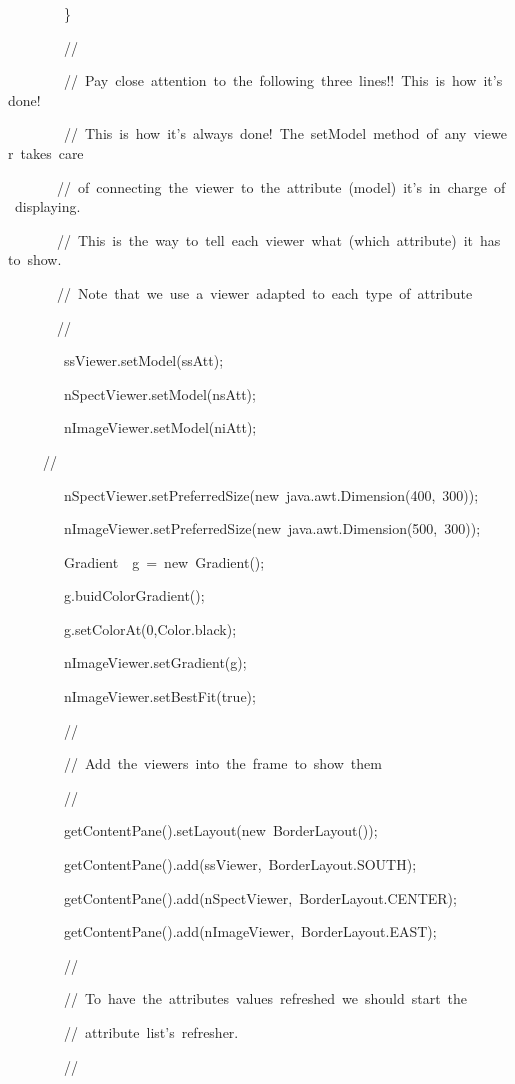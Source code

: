 \begin{lyxcode}
~~~~~~~~\}~~~~~~~~

~~~~~~~~//

~~~~~~~~//~Pay~close~attention~to~the~following~three~lines!!~This~is~how~it's~done!

~~~~~~~~//~This~is~how~it's~always~done!~The~setModel~method~of~any~viewer~takes~care

~~~~~~~//~of~connecting~the~viewer~to~the~attribute~(model)~it's~in~charge~of~displaying.

~~~~~~~//~This~is~the~way~to~tell~each~viewer~what~(which~attribute)~it~has~to~show.

~~~~~~~//~Note~that~we~use~a~viewer~adapted~to~each~type~of~attribute

~~~~~~~//

~~~~~~~~ssViewer.setModel(ssAtt);

~~~~~~~~nSpectViewer.setModel(nsAtt);

~~~~~~~~nImageViewer.setModel(niAtt);

~~~~~//

~~~~~~~~nSpectViewer.setPreferredSize(new~java.awt.Dimension(400,~300));

~~~~~~~~nImageViewer.setPreferredSize(new~java.awt.Dimension(500,~300));

~~~~~~~~Gradient~~g~=~new~Gradient();

~~~~~~~~g.buidColorGradient();

~~~~~~~~g.setColorAt(0,Color.black);

~~~~~~~~nImageViewer.setGradient(g);

~~~~~~~~nImageViewer.setBestFit(true);

~~~~~~~~//

~~~~~~~~//~Add~the~viewers~into~the~frame~to~show~them

~~~~~~~~//

~~~~~~~~getContentPane().setLayout(new~BorderLayout());

~~~~~~~~getContentPane().add(ssViewer,~BorderLayout.SOUTH);

~~~~~~~~getContentPane().add(nSpectViewer,~BorderLayout.CENTER);

~~~~~~~~getContentPane().add(nImageViewer,~BorderLayout.EAST);

~~~~~~~~//

~~~~~~~~//~To~have~the~attributes~values~refreshed~we~should~start~the

~~~~~~~~//~attribute~list's~refresher.

~~~~~~~~//


\end{lyxcode}

